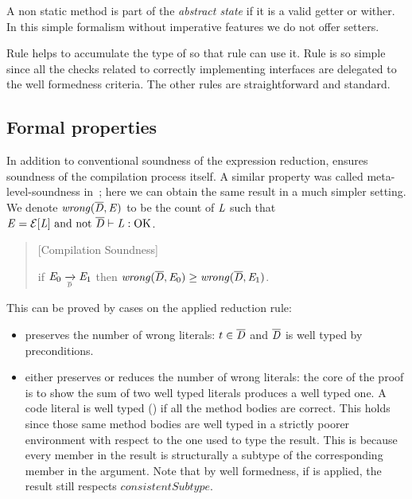 \noindent A non static method is part of the \emph{abstract state} if 
it is a valid getter or wither. In this simple formalism without imperative features we do not offer setters.


Rule  helps to accumulate the type of \Q@this@ so that rule 
can use it.
Rule  is so simple since all the checks
related to correctly implementing interfaces are delegated to the well formedness criteria.
The other rules are straightforward and standard.

\saveSpace
\subsection{Formal properties}
\saveSpace
In addition to conventional soundness of the expression reduction,
\name ensures soundness of the compilation process itself.
A similar property was called meta-level-soundness in~\cite{servetto2014meta}; here we can obtain the same result in
a much simpler setting.
We denote $\mathit{wrong}(\overline{\mathit{D}},\mathit{E})$ to be the count of $\mathit{L}$ such that
$\mE=\ctx[\mL]\ \text{and not}\ \overline\mD\vdash\mL:\text{OK}$.

\begin{quote}[Compilation Soundness]

if $\mE_0 \xrightarrow[\smallDs]{} \mE_1$
then $\mathit{wrong}(\overline{\mathit{D}},\mathit{E}_0)\geq\mathit{wrong}(\overline{\mathit{D}},\mathit{E}_1)$.
\end{quote}
\saveSpace\saveSpace\saveSpace
\noindent This can be proved by cases on the applied reduction rule:
\begin{itemize}
\item
{} preserves the number of wrong literals:
$t \in \overline{\mathit{D}}$ and $\overline{\mathit{D}}$ is well typed by  preconditions.
\item {} either preserves or reduces the number of
wrong literals:
the core of the proof is to show the sum of two well typed literals produces a well typed one.
A code literal is well typed () if all the method bodies are correct.
This holds since those same method bodies
are well typed in a strictly poorer environment with respect to the one used to type the result.
This is because every member in the result
is structurally a subtype of
the corresponding member in the argument.
Note that by well formedness, if 
is applied, the result still respects 
$\mathit{consistentSubtype}$.
\end{itemize}

